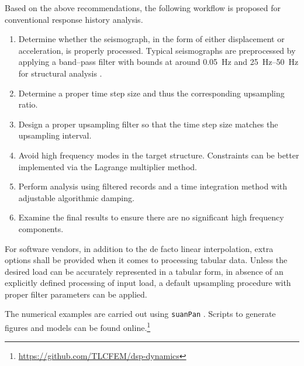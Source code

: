 Based on the above recommendations, the following workflow is proposed for conventional response history analysis.
\begin{enumerate}
\item Determine whether the seismograph, in the form of either displacement or acceleration, is properly processed. Typical seismographs are preprocessed by applying a band--pass filter with bounds at around \SI{0.05}{\hertz} and \SIrange{25}{50}{\hertz} for structural analysis \citep[see, e.g.,][]{Houtte2017}.
\item Determine a proper time step size and thus the corresponding upsampling ratio.
\item Design a proper upsampling filter so that the time step size matches the upsampling interval.
\item Avoid high frequency modes in the target structure. Constraints can be better implemented via the Lagrange multiplier method.
\item Perform analysis using filtered records and a time integration method with adjustable algorithmic damping.
\item Examine the final results to ensure there are no significant high frequency components.
\end{enumerate}

For software vendors, in addition to the de facto linear interpolation, extra options shall be provided when it comes to processing tabular data. Unless the desired load can be accurately represented in a tabular form, in absence of an explicitly defined processing of input load, a default upsampling procedure with proper filter parameters can be applied.

The numerical examples are carried out using \texttt{suanPan} \citep{Chang2022}. Scripts to generate figures and models can be found online.\footnote{\url{https://github.com/TLCFEM/dsp-dynamics}}